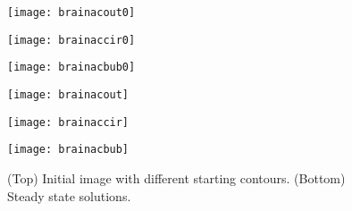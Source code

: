 \begin{figure}[htb!]
	\centering
	\begin{minipage}{0.31\textwidth}
		\texttt{[image: brainacout0]}
	\end{minipage}%
	\begin{minipage}{0.31\textwidth}
		\texttt{[image: brainaccir0]}
	\end{minipage}%
	\begin{minipage}{0.31\textwidth}
		\texttt{[image: brainacbub0]}
	\end{minipage}
	\begin{minipage}{0.31\textwidth}
		\texttt{[image: brainacout]}
	\end{minipage}%
	\begin{minipage}{0.31\textwidth}
		\texttt{[image: brainaccir]}
	\end{minipage}%
	\begin{minipage}{0.31\textwidth}
		\texttt{[image: brainacbub]}
	\end{minipage}
	\caption{(Top) Initial image with different starting contours. (Bottom) Steady state solutions.}
	\label{fig:target_acwe}
\end{figure}

